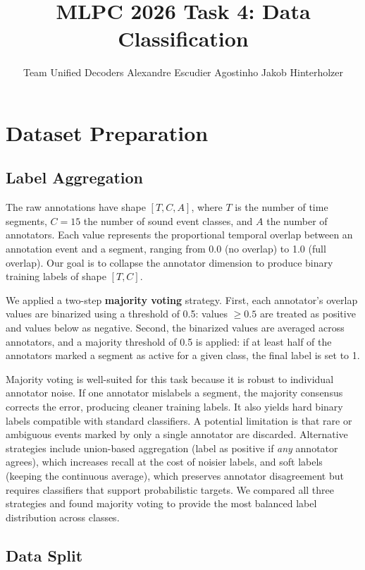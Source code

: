 \documentclass{article}
\title{MLPC 2026 Task 4: Data Classification}
\author{%
  Team Unified Decoders \AND
  Alexandre Escudier Agostinho
  \And
  Jakob Hinterholzer
}
\begin{document}
\maketitle


\section{Dataset Preparation}

\subsection{Label Aggregation}

The raw annotations have shape $[T, C, A]$, where $T$ is the number of time segments, $C = 15$ the number of sound event classes, and $A$ the number of annotators. Each value represents the proportional temporal overlap between an annotation event and a segment, ranging from 0.0 (no overlap) to 1.0 (full overlap). Our goal is to collapse the annotator dimension to produce binary training labels of shape $[T, C]$.

We applied a two-step \textbf{majority voting} strategy. First, each annotator's overlap values are binarized using a threshold of 0.5: values $\geq 0.5$ are treated as positive and values below as negative. Second, the binarized values are averaged across annotators, and a majority threshold of 0.5 is applied: if at least half of the annotators marked a segment as active for a given class, the final label is set to 1.

Majority voting is well-suited for this task because it is robust to individual annotator noise. If one annotator mislabels a segment, the majority consensus corrects the error, producing cleaner training labels. It also yields hard binary labels compatible with standard classifiers. A potential limitation is that rare or ambiguous events marked by only a single annotator are discarded. Alternative strategies include union-based aggregation (label as positive if \emph{any} annotator agrees), which increases recall at the cost of noisier labels, and soft labels (keeping the continuous average), which preserves annotator disagreement but requires classifiers that support probabilistic targets. We compared all three strategies and found majority voting to provide the most balanced label distribution across classes.

\subsection{Data Split}
\end{document}
